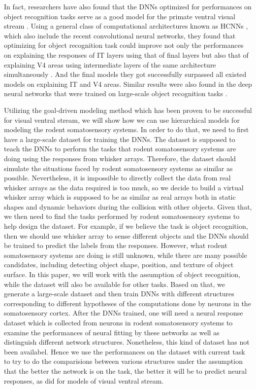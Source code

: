 In fact, researchers have also found that the DNNs optimized for performances on object recognition tasks serve as a good model for the primate ventral visual stream \cite{Yamins2013, Yamins2014, Cadieu2014}.
Using a general class of computational architectures known as HCNNs \cite{lecun1995convolutional}, which also include the recent convolutional neural networks, they found that optimizing for object recognition task could improve not only the performances on explaining the responses of IT layers using that of final layers but also that of explaining V4 areas using intermediate layers of the same architecture simultaneously \cite{Cadieu2014}.
And the final models they got successfully surpassed all existed models on explaining IT and V4 areas. Similar results were also found in the deep neural networks that were trained on large-scale object recognition tasks \cite{Yamins2014}.

Utilizing the goal-driven modeling method which has been proven to be successful for visual ventral stream, we will show how we can use hierarchical models for modeling the rodent somatosensory systems.
In order to do that, we need to first have a large-scale dataset for training the DNNs.
The dataset is supposed to teach the DNNs to perform the tasks that rodent somatosensory systems are doing using the responses from whisker arrays.
Therefore, the dataset should simulate the situations faced by rodent somatosensory systems as similar as possible. 
Nevertheless, it is impossible to directly collect the data from real whisker arrays as the data required is too much, so we decide to build a virtual whisker array which is supposed to be as similar as real arrays both in static shapes and dynamic behaviors during the collision with other objects.
Given that, we then need to find the tasks performed by rodent somatosensory systems to help design the dataset. 
For example, if we believe the task is object recognition, then we should use whisker array to sense different objects and the DNNs should be trained to predict the labels from the responses.
However, what rodent somatosensory systems are doing is still unknown, while there are many possible candidates, including detecting object shape, position, and texture of object surface\cite{Boubenec2012,Diamond2008,Arabzadeh2005,OConnor2010}.
In this paper, we will work with the assumption of object recognition, while the dataset will also be available for other tasks. 
Based on that, we generate a large-scale dataset and then train DNNs with different structures corresponding to different hypotheses of the computations done by neurons in the somatosensory cortex.
After the DNNs trained, one will need a neural response dataset which is collected from neurons in rodent somatosensory systems to examine the performances of neural fitting by these networks as well as distinguish different network structures.
Nonetheless, this kind of dataset has not been availabel. Hence we use the performances on the dataset with current task to try to do the comparisions between various structures under the assumption that the better the network is on the task, the better it will be to predict neural responses, as did for models of visual ventral stream.

